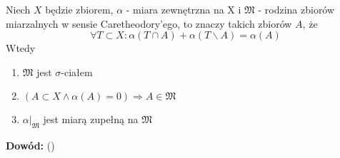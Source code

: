 \begin{tw}
	Niech $X$ będzie zbiorem, $\alpha$ - miara zewnętrzna na X i $\mathfrak{M}$ - rodzina zbiorów miarzalnych w sensie Caretheodory'ego, to znaczy takich zbiorów $A$, że 
	$$
	\forall T \subset X: \alpha(T \cap A)  + \alpha(T \backslash A) = \alpha(A)
	$$
	Wtedy 
	\begin{enumerate}	
		\item $\mathfrak{M}$ jest $\sigma$-ciałem
		\item $(A \subset X \wedge \alpha(A) = 0) \Longrightarrow A \in \mathfrak{M}$ 
		\item $\alpha|_{\mathfrak{M}}$ jest miarą zupełną na $\mathfrak{M}$ 
	\end{enumerate}
	\textbf{Dowód:} (\citep[2.30]{Tworzewski}) 
\end{tw}